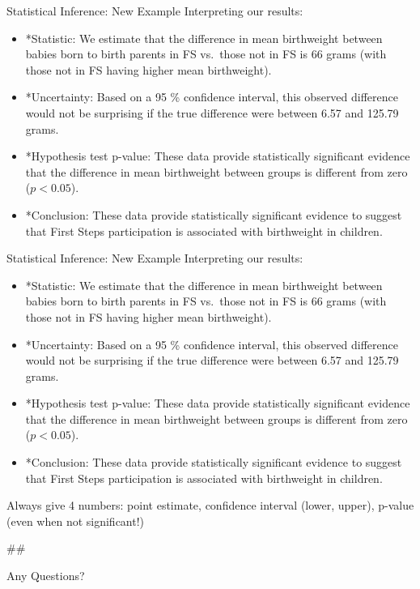 \documentclass[
  ignorenonframetext,
]{beamer}
\providecommand{\tightlist}{%
  \setlength{\itemsep}{0pt}\setlength{\parskip}{0pt}}
\begin{document}
\begin{frame}{Statistical Inference: New Example}
\protect\hypertarget{statistical-inference-new-example-14}{}
Interpreting our results:

\begin{itemize}
\tightlist
\item
  *Statistic: We estimate that the difference in mean birthweight
  between babies born to birth parents in FS vs.~those not in FS is 66
  grams (with those not in FS having higher mean birthweight).
\item
  *Uncertainty: Based on a 95 \% confidence interval, this observed
  difference would not be surprising if the true difference were between
  6.57 and 125.79 grams.
\item
  *Hypothesis test p-value: These data provide statistically significant
  evidence that the difference in mean birthweight between groups is
  different from zero (\(p < 0.05\)).
\item
  *Conclusion: These data provide statistically significant evidence to
  suggest that First Steps participation is associated with birthweight
  in children.
\end{itemize}
\end{frame}

\begin{frame}{Statistical Inference: New Example}
\protect\hypertarget{statistical-inference-new-example-15}{}
Interpreting our results:

\begin{itemize}
\tightlist
\item
  *Statistic: We estimate that the difference in mean birthweight
  between babies born to birth parents in FS vs.~those not in FS is 66
  grams (with those not in FS having higher mean birthweight).
\item
  *Uncertainty: Based on a 95 \% confidence interval, this observed
  difference would not be surprising if the true difference were between
  6.57 and 125.79 grams.
\item
  *Hypothesis test p-value: These data provide statistically significant
  evidence that the difference in mean birthweight between groups is
  different from zero (\(p < 0.05\)).
\item
  *Conclusion: These data provide statistically significant evidence to
  suggest that First Steps participation is associated with birthweight
  in children.
\end{itemize}

Always give 4 numbers: point estimate, confidence interval (lower,
upper), p-value (even when not significant!)

\#\#

Any Questions?
\end{frame}
\end{document}
